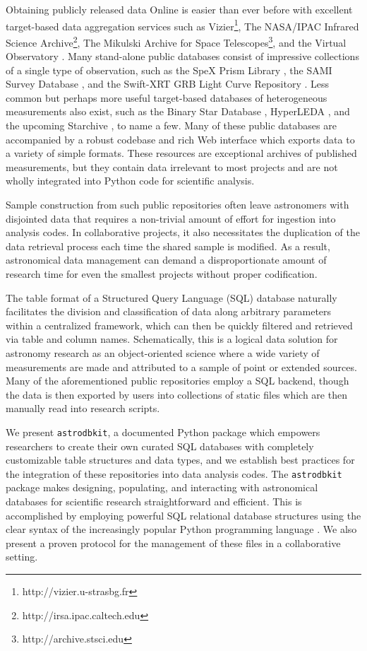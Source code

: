 \documentclass[iop,revtex4,natbib209]{emulateapj}
\begin{document}
Obtaining publicly released data Online is easier than ever before with excellent target-based data aggregation services such as Vizier\footnote{http://vizier.u-strasbg.fr}, The NASA/IPAC Infrared Science Archive\footnote{http://irsa.ipac.caltech.edu}, The Mikulski Archive for Space Telescopes\footnote{http://archive.stsci.edu}, and the Virtual Observatory \citep{Hani14}. Many stand-alone public databases consist of impressive collections of a single type of observation, such as the SpeX Prism Library \citep{Burg14a}, the SAMI Survey Database \citep{Kons15}, and the Swift-XRT GRB Light Curve Repository \citep{Evan07}. Less common but perhaps more useful target-based databases of heterogeneous measurements also exist, such as the Binary Star Database \citep{Kova15}, HyperLEDA \citep{Maka14}, and the upcoming Starchive \citep{Tann15}, to name a few. Many of these public databases are accompanied by a robust codebase and rich Web interface which exports data to a variety of simple formats. These resources are exceptional archives of published measurements, but they contain data irrelevant to most projects and are not wholly integrated into Python code for scientific analysis.

Sample construction from such public repositories often leave astronomers with disjointed data that requires a non-trivial amount of effort for ingestion into analysis codes. In collaborative projects, it also necessitates the duplication of the data retrieval process each time the shared sample is modified. As a result, astronomical data management can demand a disproportionate amount of research time for even the smallest projects without proper codification.

The table format of a Structured Query Language (SQL) database naturally facilitates the division and classification of data along arbitrary parameters within a centralized framework, which can then be quickly filtered and retrieved via table and column names. Schematically, this is a logical data solution for astronomy research as an object-oriented science where a wide variety of measurements are made and attributed to a sample of point or extended sources. Many of the aforementioned public repositories employ a SQL backend, though the data is then exported by users into collections of static files which are then manually read into research scripts. 

We present \texttt{astrodbkit}, a documented Python package which empowers researchers to create their own curated SQL databases with completely customizable table structures and data types, and we establish best practices for the integration of these repositories into data analysis codes. The \texttt{astrodbkit} package makes designing, populating, and interacting with astronomical databases for scientific research straightforward and efficient. This is accomplished by employing powerful SQL relational database structures using the clear syntax of the increasingly popular Python programming language \citep{Momc15}. We also present a proven protocol for the management of these files in a collaborative setting.
\end{document}

